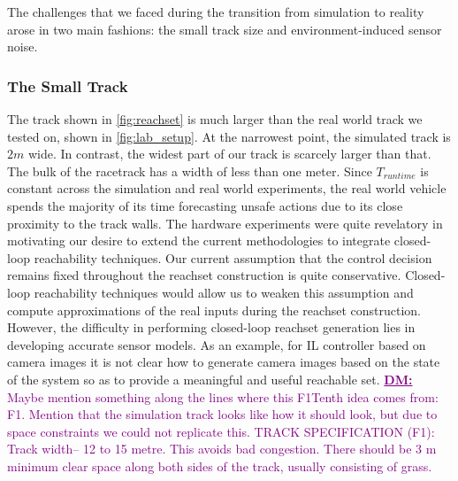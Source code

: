 \documentclass[manuscript,screen,review]{acmart}
\newcommand{\diego}[1]{\textcolor{purple}{\textbf{\underline{DM:}} #1}}
\begin{document}
The challenges that we faced during the transition from simulation to reality arose in two main fashions: the small track size and environment-induced sensor noise.

\subsubsection{The Small Track} The track shown in \ref{fig:reachset} is much larger than the real world track we tested on, shown in \ref{fig:lab_setup}. At the narrowest point, the simulated track is $2m$ wide. In contrast, the widest part of our track is scarcely larger than that. The bulk of the racetrack has a width of less than one meter. Since $T_{runtime}$ is constant across the simulation and real world experiments, the real world vehicle spends the majority of its time forecasting unsafe actions due to its close proximity to the track walls. The hardware experiments were quite revelatory in motivating our desire to extend the current methodologies to integrate closed-loop reachability techniques. Our current assumption that the control decision remains fixed throughout the reachset construction is quite conservative. Closed-loop reachability techniques would allow us to weaken this assumption and compute approximations of the real inputs during the reachset construction. However, the difficulty in performing closed-loop reachset generation lies in developing accurate sensor models. As an example, for IL controller based on camera images it is not clear how to generate camera images based on the state of the system so as to provide a meaningful and useful reachable set.
\diego{Maybe mention something along the lines where this F1Tenth idea comes from: F1. Mention that the simulation track looks like how it should look, but due to space constraints we could not replicate this. TRACK SPECIFICATION (F1): Track width– 12 to 15 metre. This avoids bad congestion. There should be 3 m minimum clear space along both sides of the track, usually consisting of grass.}
\end{document}
